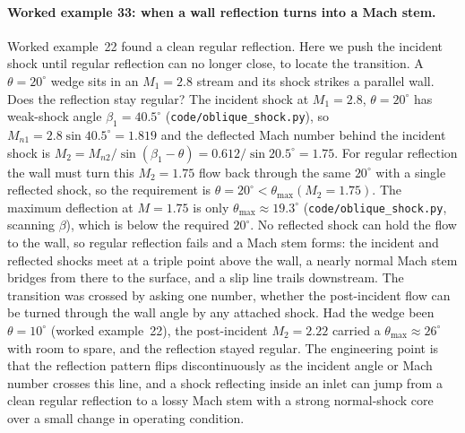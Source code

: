 \paragraph{Worked example 33: when a wall reflection turns into a Mach
stem.} Worked example~22 found a clean regular reflection. Here we push
the incident shock until regular reflection can no longer close, to
locate the transition. A $\theta = 20^{\circ}$ wedge sits in an
$M_1 = 2.8$ stream and its shock strikes a parallel wall. Does the
reflection stay regular? The incident shock at $M_1 = 2.8$,
$\theta = 20^{\circ}$ has weak-shock angle $\beta_1 = 40.5^{\circ}$
(\texttt{code/oblique\_shock.py}), so
$M_{n1} = 2.8\sin 40.5^{\circ} = 1.819$ and the deflected Mach number
behind the incident shock is
$M_2 = M_{n2}/\sin(\beta_1 - \theta) = 0.612/\sin 20.5^{\circ} = 1.75$.
For regular reflection the wall must turn this $M_2 = 1.75$ flow back
through the same $20^{\circ}$ with a single reflected shock, so the
requirement is $\theta = 20^{\circ} < \theta_{\max}(M_2 = 1.75)$. The
maximum deflection at $M = 1.75$ is only
$\theta_{\max} \approx 19.3^{\circ}$ (\texttt{code/oblique\_shock.py},
scanning $\beta$), which is below the required $20^{\circ}$. No
reflected shock can hold the flow to the wall, so regular reflection
fails and a Mach stem forms: the incident and reflected shocks meet at a
triple point above the wall, a nearly normal Mach stem bridges from
there to the surface, and a slip line trails downstream. The transition
was crossed by asking one number, whether the post-incident flow can be
turned through the wall angle by any attached shock. Had the wedge been
$\theta = 10^{\circ}$ (worked example~22), the post-incident
$M_2 = 2.22$ carried a $\theta_{\max} \approx 26^{\circ}$ with room to
spare, and the reflection stayed regular. The engineering point is that
the reflection pattern flips discontinuously as the incident angle or
Mach number crosses this line, and a shock reflecting inside an inlet
can jump from a clean regular reflection to a lossy Mach stem with a
strong normal-shock core over a small change in operating condition.

